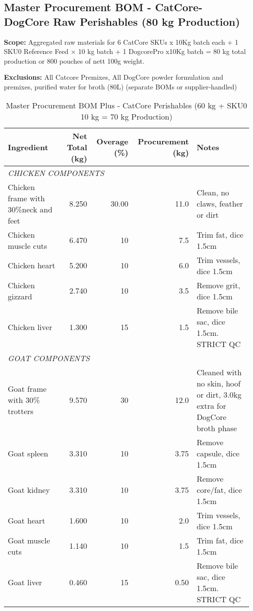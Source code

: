 \subsection*{Master Procurement BOM - CatCore- DogCore Raw Perishables (80 kg Production)}
 
\textbf{Scope:} Aggregated raw materials for 6 CatCore SKUs x 10Kg batch each + 1 SKU0 Reference Feed × 10 kg batch + 1 DogcorePro x10Kg batch = 80 kg total production or 800 pouches of nett 100g weight. 

\textbf{Exclusions:} All Catcore Premixes, All  DogCore powder formulation and premixes, purified water for broth (80L) (separate BOMs or supplier-handled)

\begin{table}[h]
\centering
\caption{Master Procurement BOM Plus - CatCore Perishables (60 kg + SKU0 10 kg = 70 kg Production)}
\begin{tabular}{@{}lrrrp{5cm}@{}}
\toprule
\textbf{Ingredient} & \textbf{Net Total (kg)} & \textbf{Overage (\%)} & \textbf{Procurement (kg)} & \textbf{Notes} \\
\midrule
\multicolumn{5}{l}{\textit{CHICKEN COMPONENTS}} \\
Chicken frame with 30\%neck and feet & 8.250 & 30.00 & 11.0 & Clean, no claws, feather or dirt  \\
Chicken muscle cuts & 6.470 & 10 & 7.5 & Trim fat, dice 1.5cm \\
Chicken heart & 5.200 & 10 & 6.0 & Trim vessels, dice 1.5cm \\
Chicken gizzard & 2.740 & 10 & 3.5 & Remove grit, dice 1.5cm \\
Chicken liver & 1.300 & 15 & 1.5 & Remove bile sac, dice 1.5cm. STRICT QC \\
\midrule
\multicolumn{5}{l}{\textit{GOAT COMPONENTS}} \\
Goat frame with 30\% trotters & 9.570 & 30 & 12.0 & Cleaned with no skin, hoof or dirt, 3.0kg extra for DogCore broth phase \\
Goat spleen & 3.310 & 10 & 3.75 & Remove capsule, dice 1.5cm \\
Goat kidney & 3.310 & 10 & 3.75 & Remove core/fat, dice 1.5cm \\
Goat heart & 1.600 & 10 & 2.0 & Trim vessels, dice 1.5cm \\
Goat muscle cuts & 1.140 & 10 & 1.5 & Trim fat, dice 1.5cm \\
Goat liver & 0.460 & 15 & 0.50 & Remove bile sac, dice 1.5cm. STRICT QC \\

\end{tabular}
\end{table}
